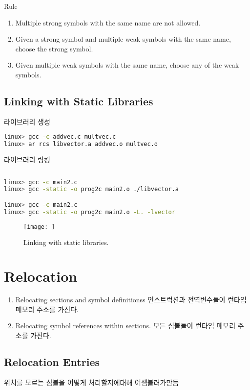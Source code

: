 Rule
\begin{enumerate}
    \item Multiple strong symbols with the same name are not allowed.
    \item Given a strong symbol and multiple weak symbols with the same name, choose the strong symbol.
    \item Given multiple weak symbols with the same name, choose any of the weak symbols.
\end{enumerate}

\subsection{Linking with Static Libraries}

라이브러리 생성

\begin{lstlisting}[language=bash]
linux> gcc -c addvec.c multvec.c
linux> ar rcs libvector.a addvec.o multvec.o
\end{lstlisting}

라이브러리 링킹

\begin{lstlisting}[language=bash]
    
linux> gcc -c main2.c
linux> gcc -static -o prog2c main2.o ./libvector.a

linux> gcc -c main2.c
linux> gcc -static -o prog2c main2.o -L. -lvector

\end{lstlisting}

\begin{figure}[h!]
    \centering
    \texttt{[image: ]}
    \caption{Linking with static libraries.}
\end{figure}




\section{Relocation}

\begin{enumerate}
    \item Relocating sections and symbol definitionss   인스트럭션과 전역변수들이 런타임 메모리 주소를 가진다.
    \item Relocating symbol references within sections.    
    모든 심볼들이 런타임 메모리 주소를 가진다.
\end{enumerate}

\subsection{Relocation Entries}
위치를 모르는 심볼을 어떻게 처리할지에대해 어셈블러가만듬


